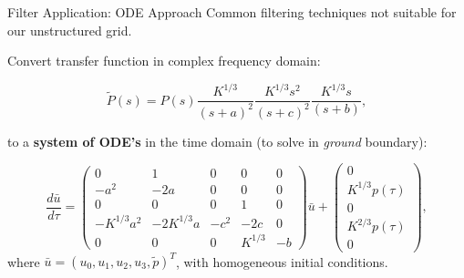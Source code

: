 \documentclass{beamer}
\newcounter{sectionframecount}
\begin{document}
\begin{frame}[t]{Filter Application: ODE Approach}
\vspace{-10pt}
Common filtering techniques not suitable for our unstructured grid.

\vspace{8pt}
Convert transfer function in complex frequency domain:

\begin{equation}
  \tilde{P}(s) =P(s)\dfrac{K^{1/3}}{(s+a)^2}\dfrac{K^{1/3}s^2}{(s+c)^2}\dfrac{K^{1/3}s}{(s+b)},
\end{equation}

to a \textbf{system of ODE's} in the time domain (to solve in \textit{ground} boundary):

\begin{equation}
  \dfrac{d\bar{u}}{d\tau} =
      \begin{pmatrix}
          0 & 1 & 0 & 0 & 0\\
          -a^2 & -2a & 0 & 0 & 0\\
          0 & 0 & 0 & 1 & 0\\
          -K^{1/3}a^2 & -2K^{1/3}a & -c^2 & -2c & 0\\
          0 & 0 & 0 &K^{1/3} & -b
      \end{pmatrix}
      \bar{u}
      +
      \begin{pmatrix}
          0 \\
          K^{1/3}p(\tau)\\
          0\\
          K^{2/3}p(\tau)\\
          0
      \end{pmatrix},
  \end{equation}
where $\bar{u}=(u_0,u_1,u_2,u_3,\tilde{p})^T$, with homogeneous initial conditions.
\end{frame}

\end{document}
